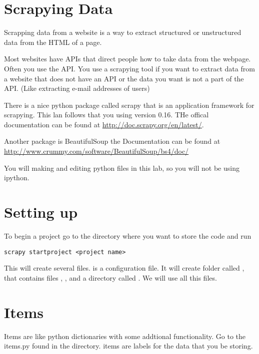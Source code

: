 
\section*{Scrapying Data}
Scrapping data from a website is a way to extract structured or unstructured data from the HTML of a page.

Most websites have APIs that direct people how to take data from the webpage. Often you use the API. You use a scrapying tool if you want to extract data from a website that does not have an API or the data you want is not a part of the API. (Like extracting e-mail addresses of users)

There is a nice python package called scrapy that is an application framework for scrapying. This lan follows that you using version 0.16. THe offical documentation can be found at \url{http://doc.scrapy.org/en/latest/}. 

Another package is BeautifulSoup the Documentation can be found at \url{http://www.crummy.com/software/BeautifulSoup/bs4/doc/}

\begin{info}
You will making and editing python files in this lab, so you will not be using ipython.
\end{info}

\section*{Setting up}

To begin a project go to the directory where you want to store the code and run
\begin{lstlisting}
scrapy startproject <project name>
\end{lstlisting}
This will create several files.  is a configuration file. It will create folder called  , that contains files , ,  and a directory called . We will use all this files.

\section*{Items}
Items are like python dictionaries with some addtional functionality. Go to the items.py found in the   directory. items are labels for the data that you be storing.

